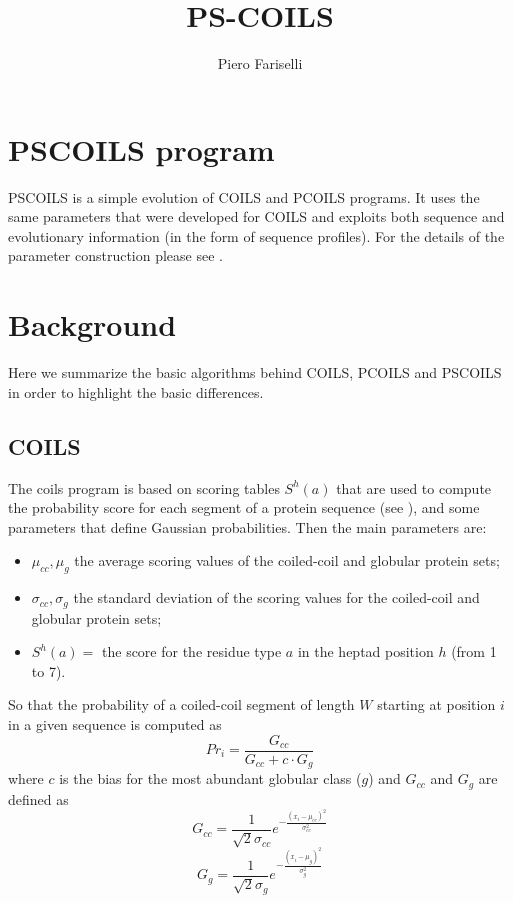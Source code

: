 \documentclass[11pt,english]{article}
\title{PS-COILS}
\author{Piero Fariselli}
\begin{document}
\maketitle

\section{PSCOILS program}

PSCOILS is a simple evolution of COILS \cite{Lupas} and PCOILS \cite{pcoils} programs.
It uses the same parameters that were developed for COILS and exploits both sequence and
evolutionary information (in the form of sequence profiles). For the details of the
parameter construction please see \cite{Lupas,comparison}. 

\section{Background}

Here we summarize the basic algorithms behind COILS, PCOILS and PSCOILS in order to
highlight the basic differences.

\subsection{COILS}
The coils program is based on scoring tables $S^h(a)$ that are used to compute the probability score
for each segment of a protein sequence (see \cite{Lupas}), and some parameters that
define Gaussian probabilities. Then the main parameters are:
\begin{itemize}
\item $ \mu_{cc}, \mu_{g}$ the average scoring values of the coiled-coil and globular protein sets;
\item $ \sigma_{cc}, \sigma_{g}$ the standard deviation of the scoring values for the 
      coiled-coil and globular protein sets;
\item $ S^h(a)=$ the score for the residue type $a$ in the heptad position $h$ (from 1 to 7).
\end{itemize}
So that the probability of a coiled-coil segment of length $W$ starting at position $i$ in 
a given sequence is computed as
\begin{equation}
Pr_i=\frac{G_{cc}}{G_{cc}+c\cdot G_{g}}
\end{equation}
where $c$ is the bias for the most abundant globular class ($g$) and
$G_{cc}$ and $G_{g}$ are defined as
\begin{equation}
G_{cc}=\frac{1}{\surd{2}\sigma_{cc}}e^{-\frac{(x_i-\mu_{cc})^2}{\sigma_{cc}^2}}
\end{equation}
\begin{equation}
G_{g}=\frac{1}{\surd{2}\sigma_{g}}e^{-\frac{(x_i-\mu_{g})^2}{\sigma_{g}^2}}
\end{equation}
\end{document}
